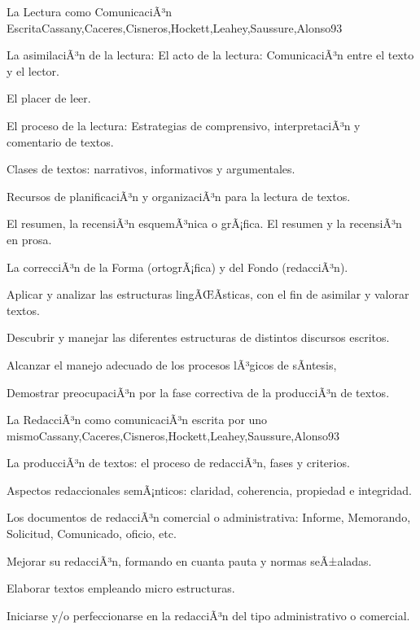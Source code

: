 \begin{syllabus}
\begin{unit}{La Lectura como ComunicaciÃ³n Escrita}{Cassany,Caceres,Cisneros,Hockett,Leahey,Saussure,Alonso}{9}{3}
\begin{topics}
   \item La asimilaciÃ³n de la lectura: El acto de la lectura: ComunicaciÃ³n entre el texto y el lector. 
   \item El placer de leer.  
   \item El proceso de la lectura: Estrategias de comprensivo, interpretaciÃ³n y comentario de textos.
   \item Clases de textos: narrativos, informativos y argumentales. 
   \item Recursos de planificaciÃ³n y organizaciÃ³n para la lectura de textos.
   \item El resumen, la recensiÃ³n esquemÃ³nica o grÃ¡fica. El resumen y la recensiÃ³n en prosa.
   \item La correcciÃ³n de la Forma (ortogrÃ¡fica) y del Fondo (redacciÃ³n).
\end{topics}
\begin{unitgoals}
   \item Aplicar y analizar las estructuras lingÃŒÃ­sticas, con el fin de asimilar y valorar textos.
   \item Descubrir y manejar las diferentes estructuras de distintos discursos escritos.
   \item Alcanzar el manejo adecuado de los procesos lÃ³gicos de sÃ­ntesis,
   \item Demostrar preocupaciÃ³n por la fase correctiva de la producciÃ³n de textos.
\end{unitgoals}
\end{unit}

\begin{unit}{La RedacciÃ³n como comunicaciÃ³n escrita por uno mismo}{Cassany,Caceres,Cisneros,Hockett,Leahey,Saussure,Alonso}{9}{3}
\begin{topics}
   \item La producciÃ³n de textos: el proceso de redacciÃ³n, fases y criterios.
   \item Aspectos redaccionales semÃ¡nticos: claridad, coherencia, propiedad e integridad.
   \item Los documentos de redacciÃ³n comercial o administrativa: Informe, Memorando, Solicitud, Comunicado, oficio, etc.
\end{topics}
\begin{unitgoals}
   \item Mejorar su redacciÃ³n, formando en cuanta pauta y normas seÃ±aladas.
   \item Elaborar textos empleando micro estructuras.
   \item Iniciarse y/o perfeccionarse en la redacciÃ³n del tipo administrativo o comercial.
\end{unitgoals}
\end{unit}


\end{syllabus}
